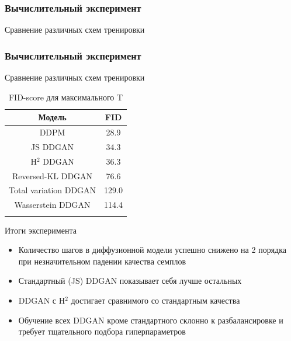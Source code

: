 \documentclass[8pt]{beamer}
\begin{document}
\begin{frame}
	\frametitle{Вычислительный эксперимент}
		\begin{block}{Сравнение различных схем тренировки}
			\begin{figure}[H]
			\end{figure}
		\end{block}
\end{frame}

\begin{frame}
	\frametitle{Вычислительный эксперимент}
	\begin{block}{Сравнение различных схем тренировки}
		\begin{longtable}{|c|c|}
			\hline
			Модель &  FID\\
			\hline
			DDPM &  28.9\\ 
			\hline
			JS DDGAN & 34.3 \\
			\hline
			H$^2$ DDGAN &  36.3\\
			\hline
			Reversed-KL DDGAN &  76.6\\
			\hline
			Total variation DDGAN &  129.0\\
			\hline
			Wasserstein DDGAN &  114.4\\
			\hline
			\caption*{FID-score для максимального T}
		\end{longtable}
	\end{block}
	\begin{block}{Итоги эксперимента}
		\begin{itemize}
			\item Количество шагов в диффузионной модели успешно снижено на 2 порядка при незначительном падении качества семплов
			\item Стандартный (JS) DDGAN показывает себя лучше остальных
			\item DDGAN с H$^2$ достигает сравнимого со стандартным качества
			\item Обучение всех DDGAN кроме стандартного склонно к разбалансировке и требует тщательного подбора гиперпараметров
		\end{itemize}
	\end{block}
\end{frame}
\end{document}
